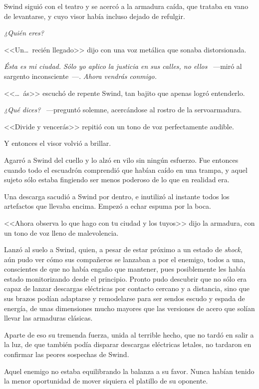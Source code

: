 Swind siguió con el teatro y se acercó a la armadura caída, que trataba en vano de levantarse, y cuyo visor había incluso dejado de refulgir.

\emph{¿Quién eres?}

<<Un\dots\ recién llegado>> dijo con una voz metálica que sonaba distorsionada.

\emph{Ésta es mi ciudad. Sólo yo aplico la justicia en sus calles, no ellos} ~---miró al sargento inconsciente~---. \emph{Ahora vendrás conmigo.}

<<\dots\ ás>> escuchó de repente Swind, tan bajito que apenas logró entenderlo.

\emph{¿Qué dices?} ~---preguntó solemne, acercándose al rostro de la servoarmadura.

<<Divide y vencerás>> repitió con un tono de voz perfectamente audible.

Y entonces el visor volvió a brillar.

Agarró a Swind del cuello y lo alzó en vilo sin ningún esfuerzo. Fue entonces cuando todo el escuadrón comprendió que habían caído en una trampa, y aquel sujeto sólo estaba fingiendo ser menos poderoso de lo que en realidad era.

Una descarga sacudió a Swind por dentro, e inutilizó al instante todos los artefactos que llevaba encima. Empezó a echar espuma por la boca.

<<Ahora observa lo que hago con tu ciudad y los tuyos>> dijo la armadura, con un tono de voz lleno de malevolencia.

Lanzó al suelo a Swind, quien, a pesar de estar próximo a un estado de \emph{shock}, aún pudo ver cómo sus compañeros se lanzaban a por el enemigo, todos a una, conscientes de que no había engaño que mantener, pues posiblemente les había estado monitorizando desde el principio. Pronto pudo descubrir que no sólo era capaz de lanzar descargas eléctricas por contacto cercano y a distancia, sino que sus brazos podían adaptarse y remodelarse para ser sendos escudo y espada de energía, de unas dimensiones mucho mayores que las versiones de acero que solían llevar las armaduras clásicas.

Aparte de eso su tremenda fuerza, unida al terrible hecho, que no tardó en salir a la luz, de que también podía disparar descargas eléctricas letales, no tardaron en confirmar las peores sospechas de Swind.

Aquel enemigo no estaba equilibrando la balanza a su favor. Nunca habían tenido la menor oportunidad de mover siquiera el platillo de su oponente.

